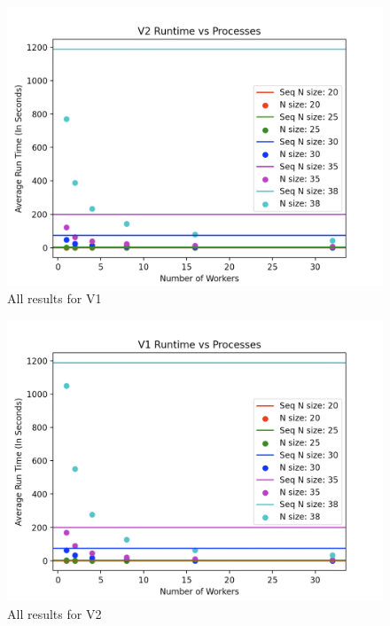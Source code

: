 \documentclass[11pt,twocolumn]{article}
\begin{document}
\begin{figure}[!htb]
    \centering
    \includegraphics[scale = 0.2]{V1ALL.png}
    \caption{All results for V1}
    \label{V2-speedup}
\end{figure}


\begin{figure}[!htb]
    \centering
    \includegraphics[scale = 0.2]{V2ALL.png}
    \caption{All results for V2}
    \label{V2-speedup}
\end{figure}
\end{document}
